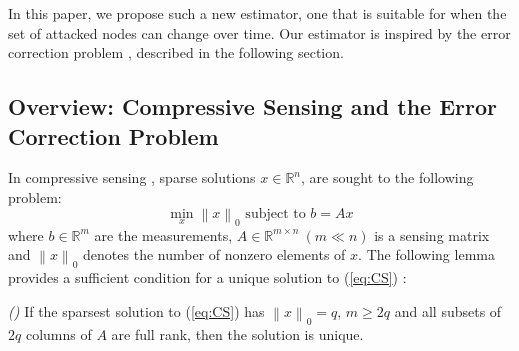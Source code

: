 \documentclass[../../thesis.tex]{subfiles}
\newcommand{\norm}[1]{\left\lVert#1\right\rVert}
\begin{document}
In this paper, we propose such a new estimator, one that is suitable for when the set of attacked nodes can change over time. Our estimator is inspired by the error correction problem \cite{tao11}, described in the following section. %


\subsection{Overview: Compressive Sensing and the Error Correction Problem \cite{tao11}} \label{sec:error_correction}
In compressive sensing \cite{tao11}, sparse solutions $x\in \mathbb{R}^n$, are sought to the following problem:
\begin{equation}
	\min_x \norm{x}_0 \text{ subject to } b= Ax
	\label{eq:CS}
\end{equation}
where $b \in \mathbb{R}^m$ are the measurements, $A \in \mathbb{R}^{m\times n}~ (m \ll n)$ is a sensing matrix and $\norm{x}_0$ denotes the number of nonzero elements of $x$. The following lemma provides a sufficient condition for a unique solution to (\ref{eq:CS}) \cite{tao11}:

\begin{lem} \emph{(\hspace{1sp}\cite{David_Chang})} \label{lem:CS}
If the sparsest solution to (\ref{eq:CS}) has $\norm{x}_0 = q$, $m\ge 2q$ and all subsets of $2q$ columns of $A$ are full rank, then the solution is unique. 
\end{lem}
\end{document}
